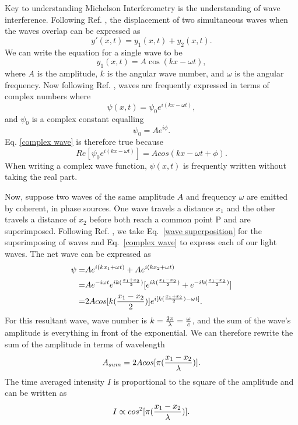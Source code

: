 \documentclass[11pt,letterpaper]{article}
\begin{document}
Key to understanding Michelson Interferometry is the understanding of wave interference. Following Ref. \cite{Halliday}, the displacement of two simultaneous waves when the waves overlap can be expressed as
\begin{equation}
    y'(x,t) = y_1(x,t) + y_2(x,t) . \label{wave superposition}
\end{equation}
We can write the equation for a single wave to be
\begin{equation}
    y_1(x,t) = A \cos(k x - \omega t) ,
\end{equation}
where $A$ is the amplitude, $k$ is the angular wave number, and $\omega$ is the angular frequency.
Now following Ref. \cite{Fitzpatrick}, waves are frequently expressed in terms of complex numbers where
\begin{equation}
    \psi (x,t) = \psi _0 e^{i (kx-\omega t)} , \label{complex wave}
\end{equation}
and $\psi _0$ is a complex constant equalling
\begin{equation}
    \psi _0 = A e^{i \phi} .
\end{equation}
Eq. \eqref{complex wave} is therefore true because
\begin{equation}
    Re[\psi _0 e^{i (kx-\omega t)}] = A cos(kx - \omega t + \phi) .
\end{equation}
When writing a complex wave function, $\psi (x,t)$ is frequently written without taking the real part. 

Now, suppose two waves of the same amplitude $A$ and frequency $\omega$ are emitted by coherent, in phase sources. One wave travels a distance $x_1$ and the other travels a distance of $x_2$ before both reach a common point P and are superimposed. Following Ref. \cite{Michelson}, we take Eq.\ \eqref{wave superposition} for the superimposing of waves and Eq.\ \eqref{complex wave} to express each of our light waves. The net wave can be expressed as
\begin{align}
    \psi = & A e^{i (k x_1 + \omega t)} + A e^{i (k x_2 + \omega t)} \\
    = & A e^{-i \omega t} e^{i k ({x_1 + x_2 \over 2})} [e^{i k ({x_1 - x_2 \over 2})} + e^{-i k ({x_1 - x_2 \over 2})}] \\
    = &2 A cos[k ({x_1 - x_2 \over 2})] e^{i [k ({x_1 + x_2 \over 2}) - \omega t]} .
\end{align}
For this resultant wave, wave number is $k = {2 \pi \over \lambda } = {\omega \over c}$, and the sum of the wave's amplitude is everything in front of the exponential. We can therefore rewrite the sum of the amplitude in terms of wavelength
\begin{equation}
    A_{sum} = 2 A cos[\pi ({x_1 - x_2 \over \lambda})] .
\end{equation}
The time averaged intensity $I$ is proportional to the square of the amplitude and can be written as
\begin{equation}
    I \propto cos^2 [\pi ({x_1 - x_2 \over \lambda})] .
\end{equation}
\end{document}
